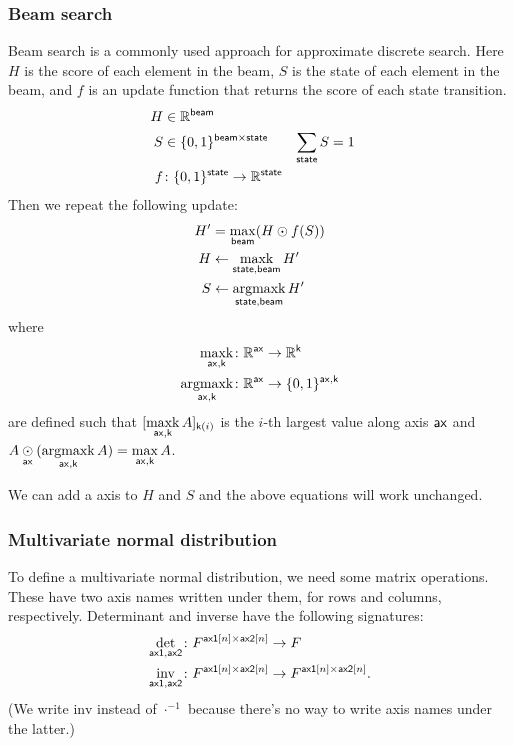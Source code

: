 \documentclass{article}
\newcommand{\reals}{\mathbb{R}}
\begin{document}
\subsubsection{Beam search}

Beam search is a commonly used approach for approximate discrete search. Here $H$ is the score of each element in the beam, $S$ is the state of each element in the beam, and $f$ is an update function that returns the score of each state transition. 
\begin{align*} 
H &\in \reals^{\name{beam}} \\
S &\in \{0, 1\}^{\name{beam} \times \name{state}} & \nsum{state} S &= 1 \\
f &\colon \{0, 1\}^{\name{state}} \rightarrow \reals^{\name{state}} \\
\end{align*}
Then we repeat the following update:
\begin{align*}
H' &= \mathop{\underset{\mathsf{beam}}{\mathrm{max}}} (H \odot f(S)) \\
H &\leftarrow \mathop{\underset{\mathsf{state,beam}}{\mathrm{maxk}}} H' \\
S &\leftarrow \mathop{\underset{\mathsf{state,beam}}{\mathrm{argmaxk}}} H'
\end{align*}
where
\begin{align*}
\nfun{ax,k}{maxk} \colon \reals^{\name{ax}} &\rightarrow \reals^{\name{k}} \\
\nfun{ax,k}{argmaxk} \colon \reals^{\name{ax}} &\rightarrow \{0,1\}^{\name{ax},\name{k}}
\end{align*}
are defined such that $[\mathop{\underset{\mathsf{ax,k}}{\mathrm{maxk}}} A]_{\mathsf{k}(i)}$ is the $i$-th largest value along axis $\mathsf{ax}$ and $A \mathbin{\underset{\mathsf{ax}}{\odot}} (\mathop{\underset{\mathsf{ax,k}}{\mathrm{argmaxk}}}{A}) = \mathop{\underset{\mathsf{ax,k}}{\mathrm{max}}} A$.

We can add a  axis to $H$ and $S$ and the above equations will work unchanged.

\subsubsection{Multivariate normal distribution}

To define a multivariate normal distribution, we need some matrix operations. These have two axis names written under them, for rows and columns, respectively. Determinant and inverse have the following signatures:
\begin{align*}
\mathop{\underset{\mathsf{ax1,ax2}}{\mathrm{det}}} \colon F^{\mathsf{ax1}[n] \times \mathsf{ax2}[n]} &\rightarrow F \\
\mathop{\underset{\mathsf{ax1,ax2}}{\mathrm{inv}}} \colon F^{\mathsf{ax1}[n] \times \mathsf{ax2}[n]} &\rightarrow F^{\mathsf{ax1}[n] \times \mathsf{ax2}[n]}.
\end{align*}
(We write $\text{inv}$ instead of $\cdot^{-1}$ because there's no way to write axis names under the latter.)
\end{document}
